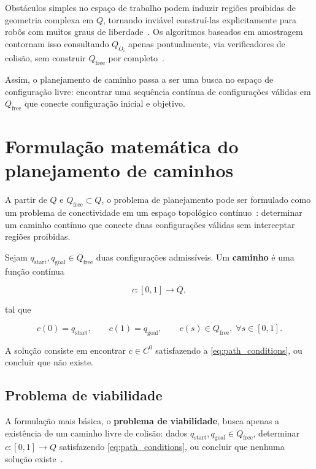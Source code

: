 Obstáculos simples no espaço de trabalho podem induzir regiões proibidas de geometria complexa em $Q$, tornando inviável construí-las explicitamente para robôs com muitos graus de liberdade~\cite{choset2005principles}. Os algoritmos baseados em amostragem contornam isso consultando $Q_{O_i}$ apenas pontualmente, via verificadores de colisão, sem construir $Q_{\mathrm{free}}$ por completo~\cite{choset2005principles, lavalle2006planning}.

Assim, o planejamento de caminho passa a ser uma busca no espaço de configuração livre: encontrar uma sequência contínua de configurações válidas em $Q_{\mathrm{free}}$ que conecte configuração inicial e objetivo.

\section{Formulação matemática do planejamento de caminhos}
\label{sec:formulacao}

A partir de $Q$ e $Q_{\mathrm{free}} \subset Q$, o problema de planejamento pode ser formulado como um problema de conectividade em um espaço topológico contínuo~\cite{choset2005principles}: determinar um caminho contínuo que conecte duas configurações válidas sem interceptar regiões proibidas.

Sejam $q_{\mathrm{start}}, q_{\mathrm{goal}} \in Q_{\mathrm{free}}$ duas configurações admissíveis. Um \textbf{caminho} é uma função contínua

\begin{equation}
    c : [0,1] \rightarrow Q,
    \label{eq:path_mapping}
\end{equation}

tal que

\begin{equation}
    c(0) = q_{\mathrm{start}}, \qquad
    c(1) = q_{\mathrm{goal}}, \qquad
    c(s) \in Q_{\mathrm{free}}, \;\forall s \in [0,1].
    \label{eq:path_conditions}
\end{equation}

A solução consiste em encontrar $c \in C^0$ satisfazendo a \autoref{eq:path_conditions}, ou concluir que não existe.

\subsection*{Problema de viabilidade}

A formulação mais básica, o \textbf{problema de viabilidade}, busca apenas a existência de um caminho livre de colisão: dados $q_{\mathrm{start}}, q_{\mathrm{goal}} \in Q_{\mathrm{free}}$, determinar $c : [0,1] \rightarrow Q$ satisfazendo \autoref{eq:path_conditions}, ou concluir que nenhuma solução existe~\citep{choset2005principles}.

